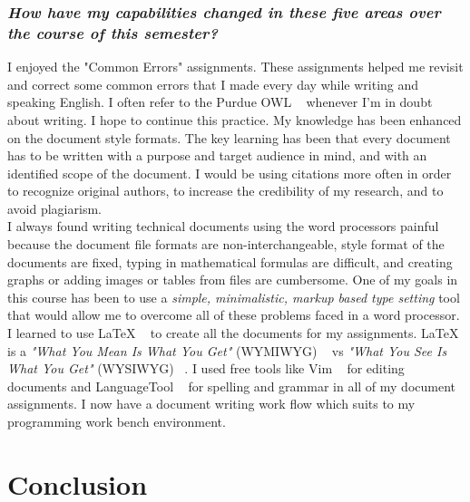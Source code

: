 \documentclass[letterpaper,12pt]{texMemo}
\begin{document}
\begin{singlespacing}
\subsubsection*{\textit{How have my capabilities changed in these five areas over the course of this semester?}}
I enjoyed the "Common Errors" assignments. These assignments helped me revisit and correct some common errors that I made every day while writing and speaking English. I often refer to the Purdue OWL ~\citep{PurdueOW20:online} whenever I'm in doubt about writing. I hope to continue this practice. My knowledge has been enhanced on the document style formats. The key learning has been that every document has to be written with a purpose and target audience in mind, and with an identified scope of the document. I would be using citations more often in order to recognize original authors, to increase the credibility of my research, and to avoid plagiarism.\\ 
I always found writing technical documents using the word processors painful because the document file formats are non-interchangeable, style format of the documents are fixed, typing in mathematical formulas are difficult, and creating graphs or adding images or tables from files are cumbersome. One of my goals in this course has been to use a \textit{simple, minimalistic, markup based type setting} tool that would allow me to overcome all of these problems faced in a word processor. I learned to use \LaTeX{} ~\citep{LaTeXAdo7:online} to create all the documents for my assignments. \LaTeX{} is a \textit{"What You Mean Is What You Get"} (WYMIWYG) ~\citep{WYSIWYMW70:online} vs \textit{"What You See Is What You Get"} (WYSIWYG) ~\citep{WYSIWYGW28:online}. I used free tools like Vim ~\citep{welcomeh42:online} for editing documents and LanguageTool ~\citep{Language47:online} for spelling and grammar in all of my document assignments. I now have a document writing work flow which suits to my programming work bench environment. \\
\section*{Conclusion}


\end{singlespacing}
\end{document}
